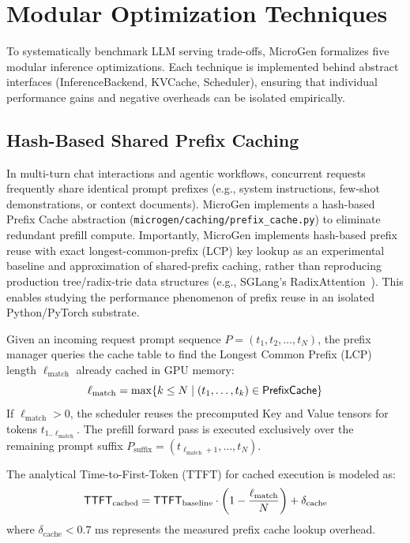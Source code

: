 \section{Modular Optimization Techniques}
\label{sec:optimizations}

To systematically benchmark LLM serving trade-offs, \textsf{MicroGen} formalizes five modular inference optimizations. Each technique is implemented behind abstract interfaces (\textsf{InferenceBackend}, \textsf{KVCache}, \textsf{Scheduler}), ensuring that individual performance gains and negative overheads can be isolated empirically.

\subsection{Hash-Based Shared Prefix Caching}
\label{sec:opt_prefix}

In multi-turn chat interactions and agentic workflows, concurrent requests frequently share identical prompt prefixes (e.g., system instructions, few-shot demonstrations, or context documents). \textsf{MicroGen} implements a hash-based Prefix Cache abstraction (\texttt{microgen/caching/prefix\_cache.py}) to eliminate redundant prefill compute. Importantly, \textsf{MicroGen} implements hash-based prefix reuse with exact longest-common-prefix (LCP) key lookup as an experimental baseline and approximation of shared-prefix caching, rather than reproducing production tree/radix-trie data structures (e.g., SGLang's RadixAttention~\cite{zheng2024sglang}). This enables studying the performance phenomenon of prefix reuse in an isolated Python/PyTorch substrate.

Given an incoming request prompt sequence $P = (t_1, t_2, \dots, t_N)$, the prefix manager queries the cache table to find the Longest Common Prefix (LCP) length $\ell_{\text{match}}$ already cached in GPU memory:
\begin{equation}
    \ell_{\text{match}} = \max \{ k \le N \mid (t_1, \dots, t_k) \in \text{\textsf{PrefixCache}} \}
\end{equation}
If $\ell_{\text{match}} > 0$, the scheduler reuses the precomputed Key and Value tensors for tokens $t_{1..\ell_{\text{match}}}$. The prefill forward pass is executed exclusively over the remaining prompt suffix $P_{\text{suffix}} = (t_{\ell_{\text{match}}+1}, \dots, t_N)$.

The analytical Time-to-First-Token (\textsf{TTFT}) for cached execution is modeled as:
\begin{equation}
    \text{\textsf{TTFT}}_{\text{cached}} = \text{\textsf{TTFT}}_{\text{baseline}} \cdot \left(1 - \frac{\ell_{\text{match}}}{N}\right) + \delta_{\text{cache}}
\end{equation}
where $\delta_{\text{cache}} < 0.7\text{ ms}$ represents the measured prefix cache lookup overhead.

